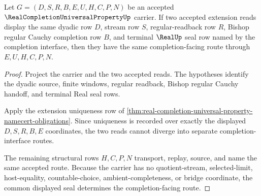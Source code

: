 \begin{theorem}
\label{thm:real-completion-universal-property-real-seal-uniqueness}
Let $G=(D,S,R,B,E,U,H,C,P,N)$ be an accepted $\RealCompletionUniversalPropertyUp$ carrier. If two accepted extension reads display the same dyadic row $D$, stream row $S$, regular-readback row $R$, Bishop regular Cauchy completion row $B$, and terminal $\RealUp$ seal row named by the completion interface, then they have the same completion-facing route through $E,U,H,C,P,N$.
\end{theorem}
\begin{proof}
Project the carrier and the two accepted reads. The hypotheses identify the dyadic source, finite windows, regular readback, Bishop regular Cauchy handoff, and terminal Real seal rows.

Apply the extension uniqueness row of \autoref{thm:real-completion-universal-property-namecert-obligations}. Since uniqueness is recorded over exactly the displayed $D,S,R,B,E$ coordinates, the two reads cannot diverge into separate completion-interface routes.

The remaining structural rows $H,C,P,N$ transport, replay, source, and name the same accepted route. Because the carrier has no quotient-stream, selected-limit, host-equality, countable-choice, ambient-completeness, or bridge coordinate, the common displayed seal determines the completion-facing route.
\end{proof}

